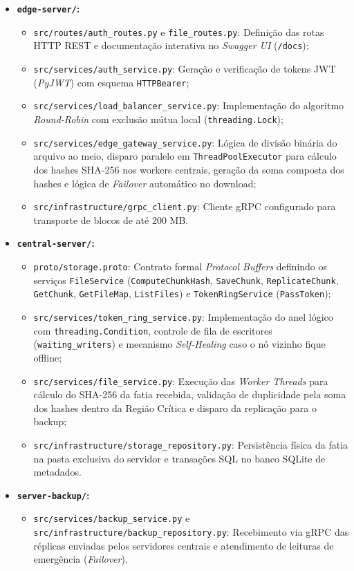 \documentclass[12pt]{article}
\begin{document}
\begin{itemize}
    \item \textbf{\texttt{edge-server/}:}
    \begin{itemize}
        \item \texttt{src/routes/auth\_routes.py} e \texttt{file\_routes.py}: Definição das rotas HTTP REST e documentação interativa no \textit{Swagger UI} (\texttt{/docs});
        \item \texttt{src/services/auth\_service.py}: Geração e verificação de tokens JWT (\textit{PyJWT}) com esquema \texttt{HTTPBearer};
        \item \texttt{src/services/load\_balancer\_service.py}: Implementação do algoritmo \textit{Round-Robin} com exclusão mútua local (\texttt{threading.Lock});
        \item \texttt{src/services/edge\_gateway\_service.py}: Lógica de divisão binária do arquivo ao meio, disparo paralelo em \texttt{ThreadPoolExecutor} para cálculo dos hashes SHA-256 nos workers centrais, geração da soma composta dos hashes e lógica de \textit{Failover} automático no download;
        \item \texttt{src/infrastructure/grpc\_client.py}: Cliente gRPC configurado para transporte de blocos de até 200 MB.
    \end{itemize}

    \item \textbf{\texttt{central-server/}:}
    \begin{itemize}
        \item \texttt{proto/storage.proto}: Contrato formal \textit{Protocol Buffers} definindo os serviços \texttt{FileService} (\texttt{ComputeChunkHash}, \texttt{SaveChunk}, \texttt{ReplicateChunk}, \texttt{GetChunk}, \texttt{GetFileMap}, \texttt{ListFiles}) e \texttt{TokenRingService} (\texttt{PassToken});
        \item \texttt{src/services/token\_ring\_service.py}: Implementação do anel lógico com \texttt{threading.Condition}, controle de fila de escritores (\texttt{waiting\_writers}) e mecanismo \textit{Self-Healing} caso o nó vizinho fique offline;
        \item \texttt{src/services/file\_service.py}: Execução das \textit{Worker Threads} para cálculo do SHA-256 da fatia recebida, validação de duplicidade pela soma dos hashes dentro da Região Crítica e disparo da replicação para o backup;
        \item \texttt{src/infrastructure/storage\_repository.py}: Persistência física da fatia na pasta exclusiva do servidor e transações SQL no banco SQLite de metadados.
    \end{itemize}

    \item \textbf{\texttt{server-backup/}:}
    \begin{itemize}
        \item \texttt{src/services/backup\_service.py} e \texttt{src/infrastructure/backup\_repository.py}: Recebimento via gRPC das réplicas enviadas pelos servidores centrais e atendimento de leituras de emergência (\textit{Failover}).
    \end{itemize}
\end{itemize}
\end{document}
